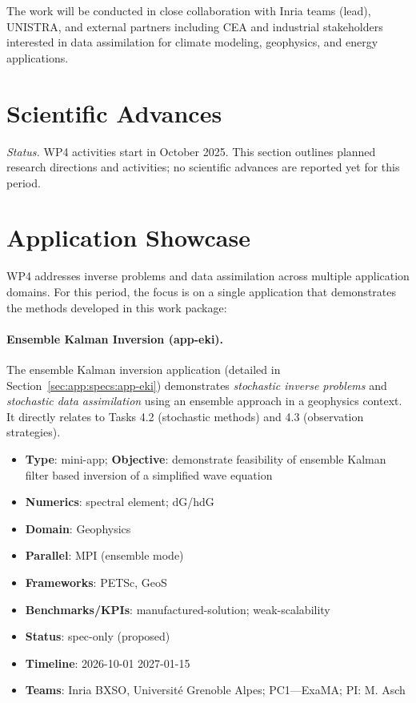 The work will be conducted in close collaboration with Inria teams (lead), UNISTRA, and external partners including CEA and industrial stakeholders interested in data assimilation for climate modeling, geophysics, and energy applications.

\section{Scientific Advances}

\noindent\textit{Status.} WP4 activities start in October 2025. This section outlines planned research directions and activities; no scientific advances are reported yet for this period.


\section{Application Showcase}
\label{sec:wp4:applications}

WP4 addresses inverse problems and data assimilation across multiple application domains. 
For this period, the focus is on a single application that demonstrates the methods developed in this work package:

\paragraph{Ensemble Kalman Inversion (app-eki).}
The ensemble Kalman inversion application (detailed in Section~\ref{sec:app:specs:app-eki}) demonstrates \emph{stochastic inverse problems} and \emph{stochastic data assimilation} using an ensemble approach in a geophysics context. It directly relates to Tasks 4.2 (stochastic methods) and 4.3 (observation strategies).

\begin{itemize}
	\item \textbf{Type}: mini-app; \textbf{Objective}: demonstrate feasibility of ensemble Kalman filter based inversion of a simplified wave equation
	\item \textbf{Numerics}: spectral element; dG/hdG
	\item \textbf{Domain}: Geophysics
	\item \textbf{Parallel}: MPI (ensemble mode)
	\item \textbf{Frameworks}: PETSc, GeoS
	\item \textbf{Benchmarks/KPIs}: manufactured-solution; weak-scalability
	\item \textbf{Status}: spec-only (proposed)
	\item \textbf{Timeline}: 2026-10-01 \textrightarrow{} 2027-01-15
	\item \textbf{Teams}: Inria BXSO, Université Grenoble Alpes; PC1—ExaMA; PI: M. Asch
\end{itemize}

